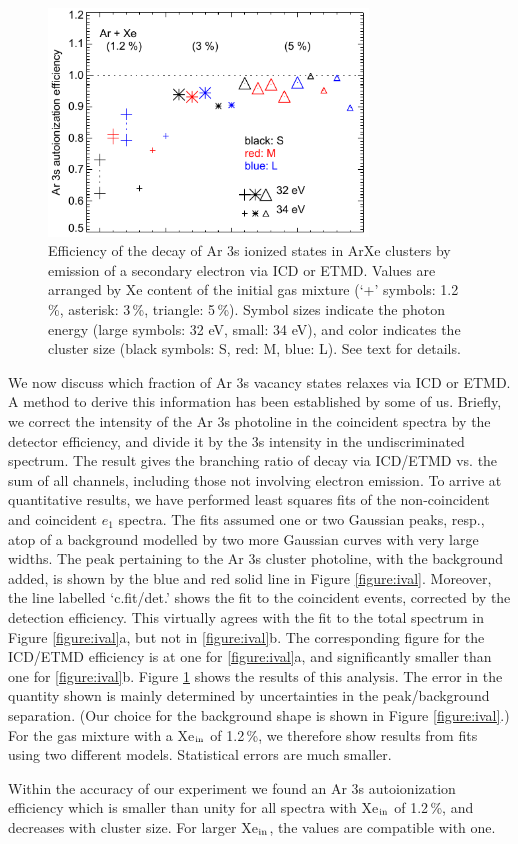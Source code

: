 \begin{figure}[ht]
 \centering
 \includegraphics[width=8.5cm]{pics/figure_eff.pdf}
 \caption{
Efficiency of the decay of Ar 3s ionized states in ArXe clusters by emission of a secondary electron via ICD or ETMD. Values are arranged by Xe content of the initial gas mixture (`+' symbols: 1.2\,\%, asterisk: 3\,\%, triangle: 5\,\%). Symbol sizes indicate the photon energy (large symbols: 32 eV, small: 34 eV), and color indicates the cluster size (black symbols: S, red: M, blue: L). See text for details.
}
 \label{figure:eff}
\end{figure}
%
We now discuss which fraction of Ar 3s vacancy states relaxes via ICD or ETMD.
A method to derive this information has been established by some of us.\cite{foerstel_2013}
Briefly, we correct the intensity of the Ar 3s photoline in the coincident spectra by the detector efficiency, and divide it by the 3s intensity in the undiscriminated spectrum.
The result gives the branching ratio of decay via ICD/ETMD vs. the sum of all channels, including those not involving electron emission.
To arrive at quantitative results, we have performed least squares fits of the non-coincident and coincident $e_1$ spectra.
The fits assumed one or two Gaussian peaks, resp., atop of a background modelled by two more Gaussian curves with very large widths.
The peak pertaining to the Ar 3s cluster photoline, with the background added, is shown by the blue and red solid line in Figure \ref{figure:ival}.
Moreover, the line labelled `c.fit/det.' shows the fit to the coincident events, corrected by the detection efficiency. 
This virtually agrees with the fit to the total spectrum in Figure \ref{figure:ival}a, but not in \ref{figure:ival}b. The corresponding figure for the ICD/ETMD efficiency is at one for \ref{figure:ival}a, and significantly smaller than one for \ref{figure:ival}b.
Figure \ref{figure:eff} shows the results of this analysis.
The error in the quantity shown is mainly determined by uncertainties in the peak/background separation.
(Our choice for the background shape is shown in Figure \ref{figure:ival}.)
For the gas mixture with a Xe$_{\rm in}$ of 1.2\,\%, we therefore show results from fits using two different models.
Statistical errors are much smaller.

Within the accuracy of our experiment we found an Ar 3s autoionization efficiency which is smaller than unity for all spectra with Xe$_{\rm in}$ of 1.2\,\%, and decreases with cluster size. 
For larger Xe$_{\rm in}$, the values are compatible with one.
